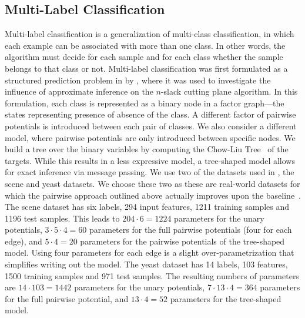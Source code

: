 \subsection{Multi-Label Classification}
Multi-label classification is a generalization of multi-class classification,
in which each example can be associated with more than one class. In other
words, the algorithm must decide for each sample and for each class whether the
sample belongs to that class or not.
Multi-label classification was first formulated as a structured prediction problem
in by \citet{finley2008training}, where it was used to investigate the influence of
approximate inference on the $n$-slack cutting plane algorithm. In this formulation,
each class is represented as a binary node in a factor graph---the states representing
presence of absence of the class. A different factor of pairwise potentials is introduced
between each pair of classes.
We also consider a different model, where pairwise potentials are only
introduced between specific nodes. We build a tree over the binary variables by
computing the Chow-Liu Tree~\citep{chow1968approximating} of the targets. While
this results in a less expressive model, a tree-shaped model allows for exact
inference via message passing.
We use two of the datasets used in \citet{finley2008training}, the scene
and yeast datasets. We choose these two as these are real-world datasets for
which the pairwise approach outlined above actually improves upon the
baseline~\citep{finley2008training}.
The scene dataset has six labels, 294 input features, 1211 training samples and
1196 test samples. This leads to $204 \cdot 6 = 1224$ parameters for the unary potentials,
$3 \cdot 5 \cdot 4 = 60$ parameters for the full pairwise potentials (four for each edge), and
$5 \cdot 4 = 20$ parameters for the pairwise potentials of the tree-shaped model.
Using four parameters for each edge is a slight over-parametrization that
simplifies writing out the model.
The yeast dataset has 14 labels, 103 features, 1500 training samples and 971
test samples. The resulting numbers of parameters are $14 \cdot 103=1442$ parameters
for the unary potentials, $7 \cdot 13 \cdot 4=364$ parameters for the full pairwise
potential, and $13 \cdot 4=52$ parameters for the tree-shaped model.

